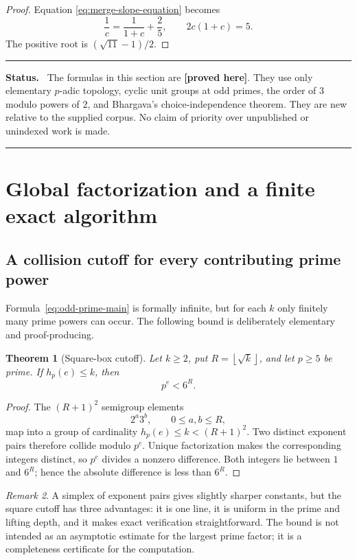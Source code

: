 \documentclass[11pt,oneside]{article}
\newtheorem{theorem}{Theorem}[section]
\theoremstyle{definition}
\theoremstyle{remark}
\newtheorem{remark}[theorem]{Remark}
\newcommand{\floor}[1]{\left\lfloor #1\right\rfloor}
\newcommand{\statusproved}{\textcolor{newgreen}{\textbf{[proved here]}}}
\newenvironment{statusbox}
{\begin{center}\begin{minipage}{0.94\textwidth}\raggedright\hrule
\vspace{0.42em}\textbf{Status.}\ }
{\par\vspace{0.32em}\hrule\end{minipage}\end{center}}
\begin{document}
\begin{proof}
Equation \eqref{eq:merge-slope-equation} becomes
\[
 \frac1c=\frac1{1+c}+\frac25,
 \qquad
 2c(1+c)=5.
\]
The positive root is \((\sqrt{11}-1)/2\).
\end{proof}

\begin{statusbox}
The formulas in this section are \statusproved.  They use only elementary \(p\)-adic topology,
cyclic unit groups at odd primes, the order of \(3\) modulo powers of \(2\), and Bhargava's
choice-independence theorem.  They are new relative to the supplied corpus.  No claim of
priority over unpublished or unindexed work is made.
\end{statusbox}

\section{Global factorization and a finite exact algorithm}
\label{sec:global-factorial}

\subsection{A collision cutoff for every contributing prime power}

Formula~\eqref{eq:odd-prime-main} is formally infinite, but for each \(k\) only finitely many
prime powers can occur.  The following bound is deliberately elementary and proof-producing.

\begin{theorem}[Square-box cutoff]
\label{thm:cutoff}
Let \(k\ge2\), put \(R=\floor{\sqrt{k}}\), and let \(p\ge5\) be prime.  If
\(h_p(e)\le k\), then
\begin{equation}
  \boxed{p^e<6^R.}
  \label{eq:cutoff}
\end{equation}
\end{theorem}

\begin{proof}
The \((R+1)^2\) semigroup elements
\[
  2^a3^b,\qquad 0\le a,b\le R,
\]
map into a group of cardinality \(h_p(e)\le k<(R+1)^2\).  Two distinct exponent pairs
therefore collide modulo \(p^e\).  Unique factorization makes the corresponding integers
distinct, so \(p^e\) divides a nonzero difference.  Both integers lie between \(1\) and
\(6^R\); hence the absolute difference is less than \(6^R\).
\end{proof}

\begin{remark}
A simplex of exponent pairs gives slightly sharper constants, but the square cutoff has three
advantages: it is one line, it is uniform in the prime and lifting depth, and it makes exact
verification straightforward.  The bound is not intended as an asymptotic estimate for the
largest prime factor; it is a completeness certificate for the computation.
\end{remark}
\end{document}
